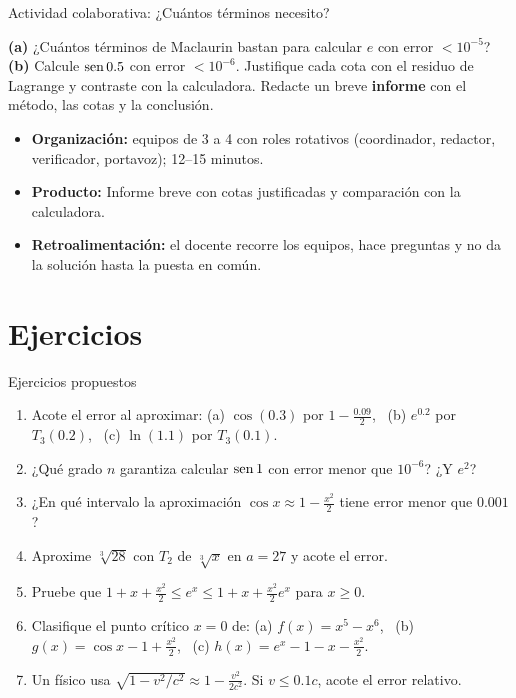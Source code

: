 \documentclass[10pt,aspectratio=169]{beamer}
\begin{document}
\begin{frame}{Actividad colaborativa: ¿Cuántos términos necesito?}
  \small
  \begin{activa}
    \textbf{(a)} ¿Cuántos términos de Maclaurin bastan para calcular $e$ con error $<10^{-5}$? \textbf{(b)} Calcule $\operatorname{sen} 0.5$ con error $<10^{-6}$. Justifique cada cota con el residuo de Lagrange y contraste con la calculadora. Redacte un breve \textbf{informe} con el método, las cotas y la conclusión.
  \end{activa}
  \begin{itemize}
    \item \textbf{Organización:} equipos de 3 a 4 con roles rotativos (coordinador, redactor, verificador, portavoz); 12--15 minutos.
    \item \textbf{Producto:} Informe breve con cotas justificadas y comparación con la calculadora.
    \item \textbf{Retroalimentación:} el docente recorre los equipos, hace preguntas y no da la solución hasta la puesta en común.
  \end{itemize}
\end{frame}

\section{Ejercicios}

\begin{frame}{Ejercicios propuestos}
  \small
  \begin{ejercicio}
    \begin{enumerate}
      \item Acote el error al aproximar: (a) $\cos(0.3)$ por $1-\frac{0.09}{2}$, \ (b) $e^{0.2}$ por $T_3(0.2)$, \ (c) $\ln(1.1)$ por $T_3(0.1)$.
      \item ¿Qué grado $n$ garantiza calcular $\operatorname{sen}1$ con error menor que $10^{-6}$? ¿Y $e^2$?
      \item ¿En qué intervalo la aproximación $\cos x\approx1-\frac{x^2}2$ tiene error menor que $0.001$?
      \item Aproxime $\sqrt[3]{28}$ con $T_2$ de $\sqrt[3]{x}$ en $a=27$ y acote el error.
      \item Pruebe que $1+x+\frac{x^2}2\le e^x\le1+x+\frac{x^2}2e^x$ para $x\ge0$.
      \item Clasifique el punto crítico $x=0$ de: (a) $f(x)=x^5-x^6$, \ (b) $g(x)=\cos x-1+\frac{x^2}{2}$, \ (c) $h(x)=e^{x}-1-x-\frac{x^2}{2}$.
      \item Un físico usa $\sqrt{1-v^2/c^2}\approx1-\frac{v^2}{2c^2}$. Si $v\le0.1c$, acote el error relativo.
    \end{enumerate}
  \end{ejercicio}
\end{frame}
\end{document}

